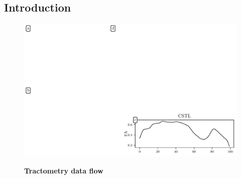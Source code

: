 \documentclass[10pt,%
               aps,%
               prl,%
               preprint,%
               superscriptaddress,%
               preprintnumbers,%
               amsmath,%
               floatfix,%
               endfloats*]{revtex4-1}
\begin{document}
\maketitle

\subsection*{Introduction}

\begin{figure}[!h]
    \vspace{0.25cm}
    \vspace{-9.75cm}
    \includegraphics[width=\columnwidth]{method-quad.pdf}
    {\label{fig:methods:tractogram}}
    {\label{fig:methods:cst}}
    {\label{fig:methods:tract-profile}}
    {\label{fig:methods:group-structure}}
    \caption{{\bf Tractometry data flow}
}
\end{figure}
\end{document}
